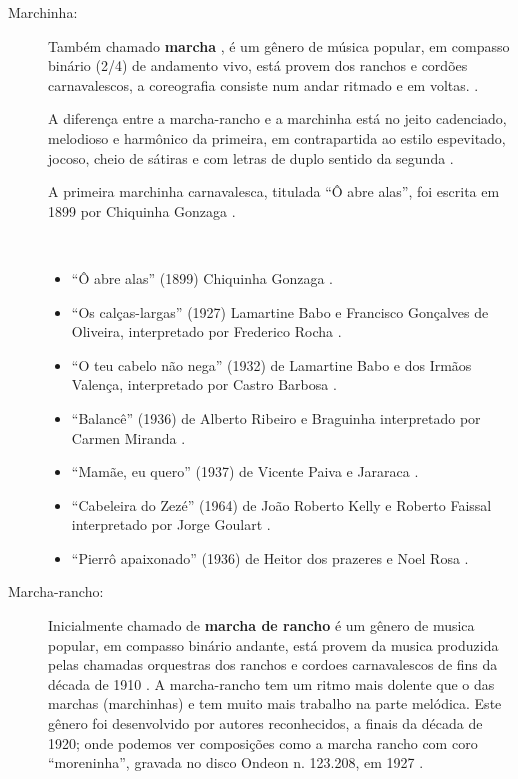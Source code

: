 \begin{description}
\item[Marchinha:] 
Também chamado \textbf{marcha} \cite[pp. 448]{marcondes1977enciclopedia},
é um gênero de música popular, em compasso binário (2/4) de andamento vivo, 
está provem dos ranchos e cordões carnavalescos, a coreografia consiste num andar ritmado e em voltas. \cite[pp. 65]{reinato2010musica}.

A diferença entre a marcha-rancho e  a marchinha está no jeito cadenciado, 
melodioso e harmônico da primeira, em contrapartida ao estilo espevitado,
jocoso, cheio de sátiras e com letras de duplo sentido da segunda \cite[pp. 84,87]{diniz2008almanaque}.

A primeira marchinha carnavalesca, titulada ``Ô abre alas'', foi escrita em 1899 por Chiquinha Gonzaga \cite[pp. 84, 239]{diniz2008almanaque}.

\begin{example} ~

\begin{itemize}
\item ``Ô abre alas'' (1899) Chiquinha Gonzaga  \cite[pp. 84, 239]{diniz2008almanaque}.
\item ``Os calças-largas'' (1927) Lamartine Babo e Francisco Gonçalves de Oliveira,
interpretado por Frederico Rocha \cite[pp. 91]{diniz2008almanaque}.
\item ``O teu cabelo não nega'' (1932) de Lamartine Babo e dos Irmãos Valença, interpretado por Castro Barbosa \cite[pp. 99]{diniz2008almanaque}.
\item ``Balancê'' (1936) de Alberto Ribeiro e Braguinha interpretado por Carmen Miranda \cite[pp. 83]{diniz2008almanaque}.
\item ``Mamãe, eu quero'' (1937) de Vicente Paiva e Jararaca \cite[pp. 584]{marcondes1977enciclopediav2} \cite[pp. 93]{diniz2008almanaque}.
\item ``Cabeleira do Zezé'' (1964) de João Roberto Kelly e Roberto Faissal interpretado por Jorge Goulart \cite[pp. 117,118]{diniz2008almanaque}.
\item ``Pierrô apaixonado'' (1936) de Heitor dos prazeres e Noel Rosa \cite[pp. 1070]{marcondes1977enciclopediav2} \cite[pp. 53]{diniz2008almanaque}.
\end{itemize}
\end{example}

\item[Marcha-rancho:] 
Inicialmente chamado de \textbf{marcha de rancho} \cite[pp. 448]{marcondes1977enciclopedia}
é um gênero de musica popular, em compasso binário andante, 
está provem da musica produzida pelas chamadas orquestras dos ranchos e cordoes 
carnavalescos de fins da década de 1910 \cite[pp. 65]{reinato2010musica} \cite[pp. 448]{marcondes1977enciclopedia}.
A marcha-rancho tem um ritmo mais dolente que o das marchas (marchinhas)
e tem muito mais trabalho na parte melódica. 
Este gênero foi desenvolvido por autores reconhecidos, 
a finais da década de 1920;
onde podemos ver composições como a marcha rancho com coro ``moreninha'',
gravada no disco Ondeon n. 123.208, em 1927 \cite[pp. 448]{marcondes1977enciclopedia}.


\end{description}
